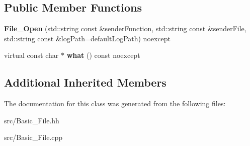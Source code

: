 \subsection*{Public Member Functions}
\begin{DoxyCompactItemize}
\item 
\hypertarget{classstb_1_1File__Open_a68a595f04a118cf6ecb47c87c0fcd22d}{{\bfseries File\+\_\+\+Open} (std\+::string const \&sender\+Function, std\+::string const \&sender\+File, std\+::string const \&log\+Path=default\+Log\+Path) noexcept}\label{classstb_1_1File__Open_a68a595f04a118cf6ecb47c87c0fcd22d}

\item 
\hypertarget{classstb_1_1File__Open_a34531a34a87288c8acee3bfde6f2e7f8}{virtual const char $\ast$ {\bfseries what} () const noexcept}\label{classstb_1_1File__Open_a34531a34a87288c8acee3bfde6f2e7f8}

\end{DoxyCompactItemize}
\subsection*{Additional Inherited Members}


The documentation for this class was generated from the following files\+:\begin{DoxyCompactItemize}
\item 
src/Basic\+\_\+\+File.\+hh\item 
src/Basic\+\_\+\+File.\+cpp\end{DoxyCompactItemize}
